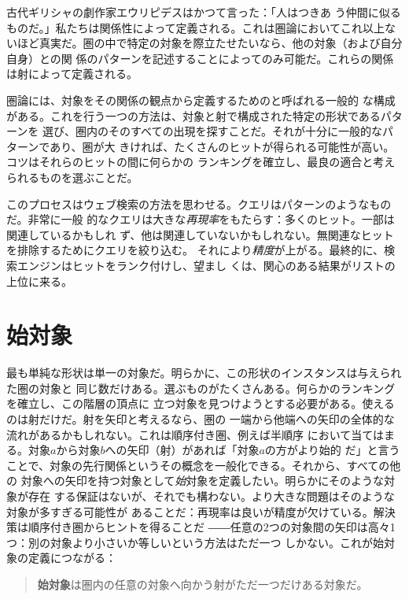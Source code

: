 
\lettrine[lhang=0.17]{古}{代ギリシャの劇作家エウリピデスはかつて言った：}「人はつきあ
う仲間に似るものだ。」私たちは関係性によって定義される。これは圏論においてこれ以上な
いほど真実だ。圏の中で特定の対象を際立たせたいなら、他の対象（および自分自身）との関
係のパターンを記述することによってのみ可能だ。これらの関係は射によって定義される。

圏論には、対象をその関係の観点から定義するためのと呼ばれる一般的
な構成がある。これを行う一つの方法は、対象と射で構成された特定の形状であるパターンを
選び、圏内のそのすべての出現を探すことだ。それが十分に一般的なパターンであり、圏が大
きければ、たくさんのヒットが得られる可能性が高い。コツはそれらのヒットの間に何らかの
ランキングを確立し、最良の適合と考えられるものを選ぶことだ。

このプロセスはウェブ検索の方法を思わせる。クエリはパターンのようなものだ。非常に一般
的なクエリは大きな\emph{再現率}をもたらす：多くのヒット。一部は関連しているかもしれ
ず、他は関連していないかもしれない。無関連なヒットを排除するためにクエリを絞り込む。
それにより\emph{精度}が上がる。最終的に、検索エンジンはヒットをランク付けし、望まし
くは、関心のある結果がリストの上位に来る。

\section{始対象}

最も単純な形状は単一の対象だ。明らかに、この形状のインスタンスは与えられた圏の対象と
同じ数だけある。選ぶものがたくさんある。何らかのランキングを確立し、この階層の頂点に
立つ対象を見つけようとする必要がある。使えるのは射だけだ。射を矢印と考えるなら、圏の
一端から他端への矢印の全体的な流れがあるかもしれない。これは順序付き圏、例えば半順序
において当てはまる。対象$a$から対象$b$への矢印（射）があれば「対象$a$の方がより始的
だ」と言うことで、対象の先行関係というその概念を一般化できる。それから、すべての他の
対象への矢印を持つ対象として\emph{始}対象を定義したい。明らかにそのような対象が存在
する保証はないが、それでも構わない。より大きな問題はそのような対象が多すぎる可能性が
あることだ：再現率は良いが精度が欠けている。解決策は順序付き圏からヒントを得ることだ
――任意の2つの対象間の矢印は高々1つ：別の対象より小さいか等しいという方法はただ一つ
しかない。これが始対象の定義につながる：

\begin{quote}
  \textbf{始対象}は圏内の任意の対象へ向かう射がただ一つだけある対象だ。
\end{quote}

